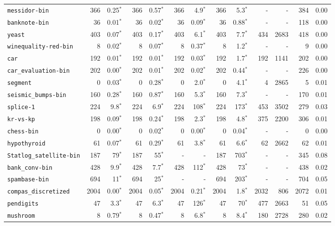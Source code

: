 \begin{tabular}{lrrrrrrrrrrrr}
\texttt{messidor-bin} & 366 & 0.25$^*$ & 366 & 0.57$^*$ & 366 & 4.9$^*$ & 366 & 5.3$^*$ & - & - & 384 & 0.00\\
\texttt{banknote-bin} & 36 & 0.01$^*$ & 36 & 0.02$^*$ & 36 & 0.09$^*$ & 36 & 0.88$^*$ & - & - & 118 & 0.00\\
\texttt{yeast} & 403 & 0.07$^*$ & 403 & 0.17$^*$ & 403 & 6.1$^*$ & 403 & 7.7$^*$ & 434 & 2683 & 418 & 0.00\\
\texttt{winequality-red-bin} & 8 & 0.02$^*$ & 8 & 0.07$^*$ & 8 & 0.37$^*$ & 8 & 1.2$^*$ & - & - & 9 & 0.00\\
\texttt{car} & 192 & 0.01$^*$ & 192 & 0.01$^*$ & 192 & 0.03$^*$ & 192 & 1.7$^*$ & 192 & 1141 & 202 & 0.00\\
\texttt{car\_evaluation-bin} & 202 & 0.00$^*$ & 202 & 0.01$^*$ & 202 & 0.02$^*$ & 202 & 0.44$^*$ & - & - & 226 & 0.00\\
\texttt{segment} & 0 & 0.03$^*$ & 0 & 0.28$^*$ & 0 & 2.0$^*$ & 0 & 4.1$^*$ & 4 & 2865 & 5 & 0.01\\
\texttt{seismic\_bumps-bin} & 160 & 0.28$^*$ & 160 & 0.87$^*$ & 160 & 5.3$^*$ & 160 & 7.3$^*$ & - & - & 170 & 0.01\\
\texttt{splice-1} & 224 & 9.8$^*$ & 224 & 6.9$^*$ & 224 & 108$^*$ & 224 & 173$^*$ & 453 & 3502 & 279 & 0.03\\
\texttt{kr-vs-kp} & 198 & 0.09$^*$ & 198 & 0.24$^*$ & 198 & 2.3$^*$ & 198 & 4.8$^*$ & 375 & 2200 & 306 & 0.01\\
\texttt{chess-bin} & 0 & 0.00$^*$ & 0 & 0.02$^*$ & 0 & 0.00$^*$ & 0 & 0.04$^*$ & - & - & 0 & 0.00\\
\texttt{hypothyroid} & 61 & 0.07$^*$ & 61 & 0.29$^*$ & 61 & 3.8$^*$ & 61 & 6.6$^*$ & 62 & 2662 & 62 & 0.01\\
\texttt{Statlog\_satellite-bin} & 187 & 79$^*$ & 187 & 55$^*$ & - & - & 187 & 703$^*$ & - & - & 345 & 0.08\\
\texttt{bank\_conv-bin} & 428 & 9.9$^*$ & 428 & 7.7$^*$ & 428 & 112$^*$ & 428 & 73$^*$ & - & - & 438 & 0.02\\
\texttt{spambase-bin} & 694 & 11$^*$ & 694 & 25$^*$ & - & - & 694 & 203$^*$ & - & - & 704 & 0.05\\
\texttt{compas\_discretized} & 2004 & 0.00$^*$ & 2004 & 0.05$^*$ & 2004 & 0.21$^*$ & 2004 & 1.8$^*$ & 2032 & 806 & 2072 & 0.01\\
\texttt{pendigits} & 47 & 3.3$^*$ & 47 & 6.3$^*$ & 47 & 126$^*$ & 47 & 70$^*$ & 477 & 2663 & 51 & 0.05\\
\texttt{mushroom} & 8 & 0.79$^*$ & 8 & 0.47$^*$ & 8 & 6.8$^*$ & 8 & 8.4$^*$ & 180 & 2728 & 280 & 0.02\\

\end{tabular}
